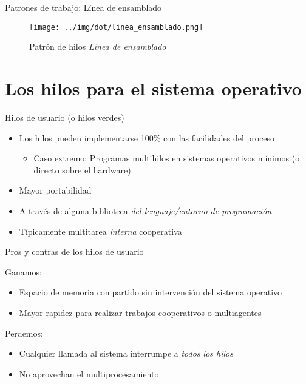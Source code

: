 \documentclass[presentation]{beamer}
\begin{document}
\begin{frame}[label={sec:orge924a51}]{Patrones de trabajo: Línea de ensamblado}
\begin{figure}[htbp]
\centering
\texttt{[image: ../img/dot/linea\_ensamblado.png]}
\caption{Patrón de hilos \emph{Línea de ensamblado}}
\end{figure}
\end{frame}

\section{Los hilos para el sistema operativo}
\label{sec:orge13ee33}

\begin{frame}[label={sec:orgbca0312}]{Hilos de usuario (o hilos verdes)}
\begin{itemize}
\item Los hilos pueden implementarse 100\% con las facilidades del proceso
\begin{itemize}
\item Caso extremo: Programas multihilos en sistemas operativos mínimos
(o directo sobre el hardware)
\end{itemize}
\item Mayor portabilidad
\item A través de alguna biblioteca \emph{del lenguaje/entorno de programación}
\item Típicamente multitarea \emph{interna} cooperativa
\end{itemize}
\end{frame}

\begin{frame}[label={sec:orgf214793}]{Pros y contras de los hilos de usuario}
\begin{center}
Ganamos:
\end{center}
\begin{itemize}
\item Espacio de memoria compartido sin intervención del sistema operativo
\item Mayor rapidez para realizar trabajos cooperativos o multiagentes
\end{itemize}
\begin{center}
Perdemos:
\end{center}
\begin{itemize}
\item Cualquier llamada al sistema interrumpe a \emph{todos los hilos}
\item No aprovechan el multiprocesamiento
\end{itemize}
\end{frame}
\end{document}
